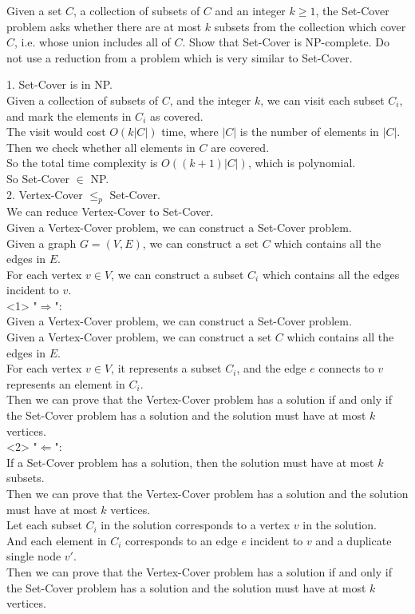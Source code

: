 \problem{}

Given a set $C$, a collection of subsets of $C$ and an integer $k \geq 1$, the Set-Cover problem asks whether there are at most $k$ subsets from the collection which cover $C$, i.e. whose union includes all of $C$. Show that Set-Cover is NP-complete. Do not use a reduction from a problem which is very similar to Set-Cover.

\solution{}

1. Set-Cover is in NP.\\
Given a collection of subsets of $C$, and the integer $k$, we can visit each subset $C_i$, and mark the elements in $C_i$ as covered.\\ The visit would cost $O(k|C|)$ time, where $|C|$ is the number of elements in $|C|$. Then we check whether all elements in $C$ are covered.\\
So the total time complexity is $O((k+1)|C|)$, which is polynomial.\\
So Set-Cover $\in$ NP.\\

2. Vertex-Cover $\leq_p$ Set-Cover.\\
We can reduce Vertex-Cover to Set-Cover.\\
Given a Vertex-Cover problem, we can construct a Set-Cover problem.\\
Given a graph $G=(V,E)$, we can construct a set $C$ which contains all the edges in $E$.\\
For each vertex $v \in V$, we can construct a subset $C_i$ which contains all the edges incident to $v$.\\

<1> "$\Rightarrow$":\\
Given a Vertex-Cover problem, we can construct a Set-Cover problem.\\
Given a Vertex-Cover problem, we can construct a set $C$ which contains all the edges in $E$.\\
For each vertex $v \in V$, it represents a subset $C_i$, and the edge $e$ connects to $v$ represents an element in $C_i$.\\
Then we can prove that the Vertex-Cover problem has a solution if and only if the Set-Cover problem has a solution and the solution must have at most $k$ vertices.\\

<2> "$\Leftarrow$":\\
If a Set-Cover problem has a solution, then the solution must have at most $k$ subsets.\\
Then we can prove that the Vertex-Cover problem has a solution and the solution must have at most $k$ vertices.\\
Let each subset $C_i$ in the solution corresponds to a vertex $v$ in the solution.\\
And each element in $C_i$ corresponds to an edge $e$ incident to $v$ and a duplicate single node $v'$.\\
Then we can prove that the Vertex-Cover problem has a solution if and only if the Set-Cover problem has a solution and the solution must have at most $k$ vertices.\\

